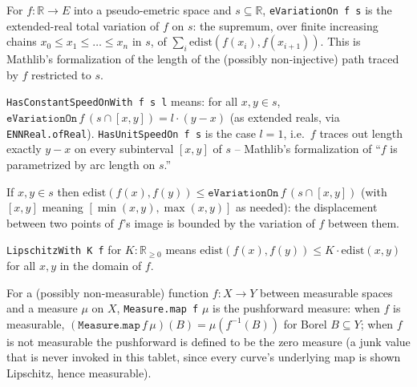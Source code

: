 \begin{definition}
  For $f : \mathbb{R} \to E$ into a pseudo-emetric space and $s \subseteq \mathbb{R}$,
  \texttt{eVariationOn f s} is the extended-real total variation of $f$ on $s$:
  the supremum, over finite increasing chains $x_0 \le x_1 \le \dots \le x_n$ in $s$, of
  $\sum_i \mathrm{edist}(f(x_i), f(x_{i+1}))$. This is Mathlib's formalization of the
  length of the (possibly non-injective) path traced by $f$ restricted to $s$.
\end{definition}

\begin{definition}
  \texttt{HasConstantSpeedOnWith f s l} means: for all $x,y \in s$,
  $\texttt{eVariationOn}\, f\, (s \cap [x,y]) = l \cdot (y-x)$ (as extended reals, via
  \texttt{ENNReal.ofReal}). \texttt{HasUnitSpeedOn f s} is the case $l=1$, i.e.\ $f$
  traces out length exactly $y-x$ on every subinterval $[x,y]$ of $s$ -- Mathlib's
  formalization of ``$f$ is parametrized by arc length on $s$.''
\end{definition}

\begin{proposition}
  If $x, y \in s$ then $\mathrm{edist}(f(x),f(y)) \le \texttt{eVariationOn}\, f\, (s \cap [x,y])$
  (with $[x,y]$ meaning $[\min(x,y),\max(x,y)]$ as needed): the displacement between two points
  of $f$'s image is bounded by the variation of $f$ between them.
\end{proposition}

\begin{definition}
  \texttt{LipschitzWith K f} for $K : \mathbb{R}_{\ge 0}$ means
  $\mathrm{edist}(f(x),f(y)) \le K \cdot \mathrm{edist}(x,y)$ for all $x,y$ in the domain of $f$.
\end{definition}

\begin{definition}
  For a (possibly non-measurable) function $f : X \to Y$ between measurable spaces and a measure
  $\mu$ on $X$, \texttt{Measure.map f} $\mu$ is the pushforward measure: when $f$ is measurable,
  $(\texttt{Measure.map}\, f\, \mu)(B) = \mu(f^{-1}(B))$ for Borel $B \subseteq Y$; when $f$ is not
  measurable the pushforward is defined to be the zero measure (a junk value that is never invoked
  in this tablet, since every curve's underlying map is shown Lipschitz, hence measurable).
\end{definition}

